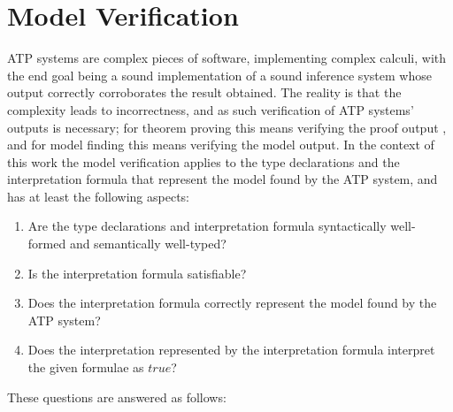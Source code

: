 \documentclass[letterpaper]{article}
\newcommand{\true}{{\mathit{true}}}
\begin{document}
\section{Model Verification}
\label{Verification}

ATP systems are complex pieces of software, implementing complex calculi, with the end goal
being a sound implementation of a sound inference system whose output correctly corroborates the
result obtained.
The reality is that the complexity leads to incorrectness, and as such verification of ATP systems'
outputs is necessary; for theorem proving this means verifying the proof output \cite{Sut06},
and for model finding this means verifying the model output.
In the context of this work the model verification applies to the type declarations and 
the \small{interpretation} formula that represent the model found by the ATP system, and
has at least the following aspects:
\begin{enumerate}
\item Are the type declarations and interpretation formula syntactically well-formed 
      and semantically well-typed?
\item Is the interpretation formula satisfiable?
\item Does the interpretation formula correctly represent the model found by the ATP system?
\item Does the interpretation represented by the interpretation formula interpret the given 
      formulae as $\true$?
\end{enumerate}
\noindent
These questions are answered as follows:
\end{document}
